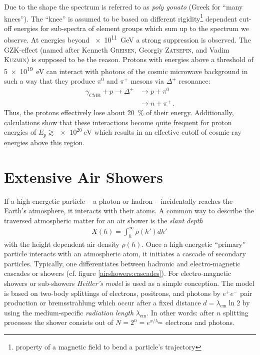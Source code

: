 Due to the shape the spectrum is referred to as \textit{poly gonato} (Greek for \enquote{many knees}). The \enquote{knee} is assumed to be based on different rigidity\footnote{property of a magnetic field to bend a particle's trajectory} dependent cut-off energies for sub-spectra of element groups which sum up to the spectrum we observe. \cite{cosmicrays:hoerandel, cosmicrays:shapiro} At energies beyond \SI{e11}{\giga\electronvolt} a strong suppression is observed. The GZK-effect (named after Kenneth \textsc{Greisen}, Georgiy \textsc{Zatsepin}, and Vadim \textsc{Kuzmin}) is supposed to be the reason. Protons with energies above a threshold of \SI{5e19}{\electronvolt} can interact with photons of the cosmic microwave background in such a way that they produce $\pi^0$ and $\pi^+$ mesons via $\Delta^+$ resonance:
\begin{align}
\gamma_\text{CMB} + p \rightarrow \Delta^+ &\rightarrow p + \pi^0\\
&\rightarrow n + \pi^+\,.
\end{align}
Thus, the protons effectively lose about \SI{20}{\percent} of their energy. Additionally, calculations show that these interactions become quite frequent for proton energies of $E_p\gtrsim\SI{e20}{\electronvolt}$ which results in an effective cutoff of cosmic-ray energies above this region. \cite{cosmicrays:gzk}

\section{Extensive Air Showers}

If a high energetic particle -- a photon or hadron -- incidentally reaches the Earth's atmosphere, it interacts with their atoms. A common way to describe the traversed atmospheric matter for an air shower is the \textit{slant depth}
\begin{align}
X(h) = \int_{h}^{\infty}\rho(h')dh'\,
\end{align}
with the height dependent air density $\rho(h)$. Once a high energetic \enquote{primary} particle interacts with an atmospheric atom, it initiates a cascade of secondary particles. Typically, one differentiates between hadronic and electro-magnetic cascades or showers (cf. figure \ref{airshowers:cascades}). For electro-magnetic showers or sub-showers \textit{Heitler's model} is used as a simple conception. The model is based on two-body splittings of electrons, positrons, and photons by $e^+ e^-$ pair production or bremsstrahlung which occur after a fixed distance $d=\lambda_\text{em}\ln{2}$ by using the medium-specific \textit{radiation length} $\lambda_\text{em}$. In other words: after $n$ splitting processes the shower consists out of $N = 2^n = e^{x/\lambda_\text{em}}$ electrons and photons.

